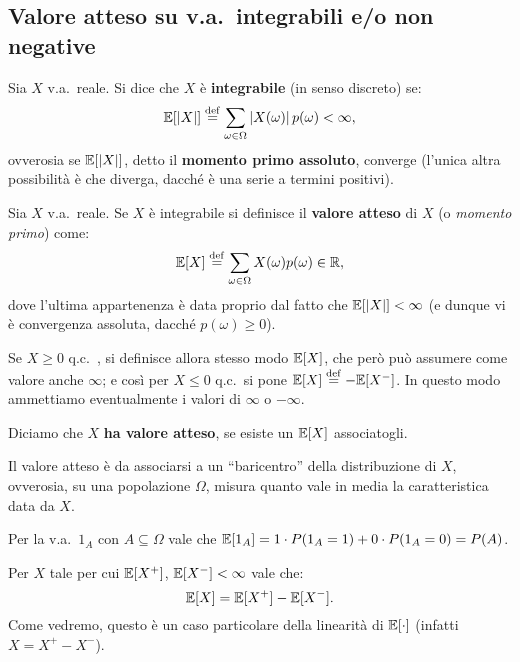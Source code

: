 \begin{multicols*}{2}
\subsection{Valore atteso su v.a.~integrabili e/o non negative}

\begin{definition}
    Sia $X$ v.a.~reale. Si dice che $X$ è \textbf{integrabile} (in senso discreto)
    se:
    \[
        \mathbb{E}[\left\lvert X \right\rvert] \overset{\mathrm{def}}{=} \sum_{\omega \in \Omega} \left\lvert X(\omega) \right\rvert p(\omega) < \infty,
    \]
    ovverosia se $\mathbb{E}[\left\lvert X \right\rvert]$, detto il \textbf{momento primo assoluto},
    converge (l'unica altra possibilità è che diverga, dacché
    è una serie a termini positivi).    
\end{definition}

\begin{definition}
    Sia $X$ v.a.~reale. Se $X$ è integrabile si definisce
    il \textbf{valore atteso} di $X$ (o \textit{momento primo}) come:
    \[
        \mathbb{E}[X] \overset{\mathrm{def}}{=} \sum_{\omega \in \Omega} X(\omega) p(\omega) \in \mathbb{R},
    \]
    dove l'ultima appartenenza è data proprio dal fatto che $\mathbb{E}[\left\lvert X \right\rvert] < \infty$ (e
    dunque vi è convergenza assoluta, dacché $p(\omega) \geq 0$). \smallskip

    Se $X \geq 0$ q.c.~, si definisce allora stesso modo $\mathbb{E}[X]$, che però può assumere come
    valore anche $\infty$; e così per $X \leq 0$ q.c.~si pone
    $\mathbb{E}[X] \overset{\mathrm{def}}{=} -\mathbb{E}[X^-]$. In questo modo ammettiamo eventualmente i valori
    di $\infty$ o $-\infty$. \smallskip

    Diciamo che $X$ \textbf{ha valore atteso}, se esiste un $\mathbb{E}[X]$ associatogli.
\end{definition}

\begin{remark}
    Il valore atteso è da associarsi a un ``baricentro'' della distribuzione di
    $X$, ovverosia, su una popolazione $\Omega$, misura quanto vale in media
    la caratteristica data da $X$.
\end{remark}

\begin{remark}
    Per la v.a.~$1_A$ con $A \subseteq \Omega$ vale che
    $\mathbb{E}[1_A] = 1 \cdot P(1_A = 1) + 0 \cdot P (1_A = 0) = P(A)$.
\end{remark}

\begin{remark}
    Per $X$ tale per cui $\mathbb{E}[X^+]$, $\mathbb{E}[X^-] < \infty$ vale che:
    \[
        \mathbb{E}[X] = \mathbb{E}[X^+] - \mathbb{E}[X^-].
    \]
    Come vedremo, questo è un caso particolare della linearità di $\mathbb{E}[\cdot]$
    (infatti $X = X^+ - X^-$).
\end{remark}


\end{multicols*}

